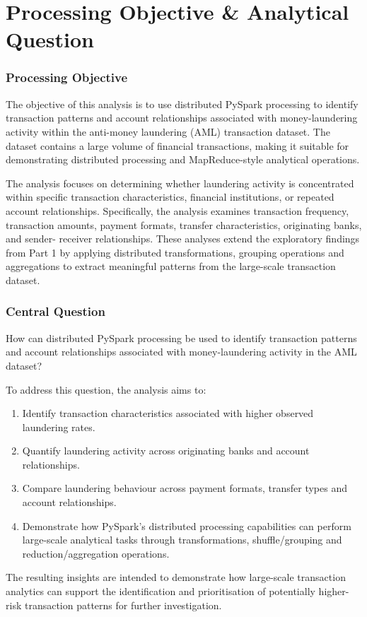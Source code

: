 \section{Processing Objective \& Analytical Question}

\subsubsection{Processing Objective}

The objective of this analysis is to use distributed PySpark processing to identify
transaction patterns and account relationships associated with money-laundering
activity within the anti-money laundering (AML) transaction dataset. The dataset contains a large volume of financial transactions, making it suitable for demonstrating distributed processing and
MapReduce-style analytical operations.

The analysis focuses on determining whether laundering activity is concentrated within
specific transaction characteristics, financial institutions, or repeated account
relationships. Specifically, the analysis examines transaction frequency, transaction
amounts, payment formats, transfer characteristics, originating banks, and sender-
receiver relationships. These analyses extend the exploratory findings from Part 1 by
applying distributed transformations, grouping operations and aggregations to extract
meaningful patterns from the large-scale transaction dataset.

\subsubsection{Central Question}

How can distributed PySpark processing be used to identify transaction patterns and
account relationships associated with money-laundering activity in the AML dataset?

To address this question, the analysis aims to:
\begin{enumerate}
    \item Identify transaction characteristics associated with higher observed laundering rates.
    \item Quantify laundering activity across originating banks and account relationships.
    \item Compare laundering behaviour across payment formats, transfer types and account relationships.
    \item Demonstrate how PySpark's distributed processing capabilities can perform large-scale analytical tasks through transformations, shuffle/grouping and reduction/aggregation operations.

\end{enumerate}

The resulting insights are intended to demonstrate how large-scale transaction analytics
can support the identification and prioritisation of potentially higher-risk transaction
patterns for further investigation.